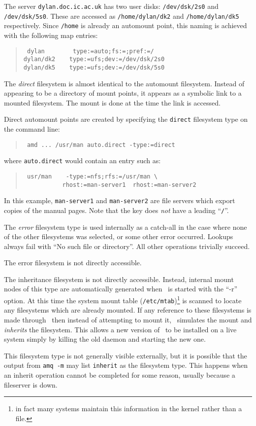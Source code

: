 The server {\tt dylan.doc.ic.ac.uk} has two user disks: {\tt /dev/dsk/2s0} and
{\tt /dev/dsk/5s0}.  These are accessed as {\tt /home/dylan/dk2} and
{\tt /home/dylan/dk5} respectively.  Since {\tt /home} is already an automount
point, this naming is achieved with the following map entries:
\begin{quote}\raggedright
\tt
dylan\ \ \ \ \ \ \ \ type:=auto;fs:=;pref:=/ \\
dylan/dk2\ \ \ \ type:=ufs;dev:=/dev/dsk/2s0 \\
dylan/dk5\ \ \ \ type:=ufs;dev:=/dev/dsk/5s0
\end{quote}

\label{direct-fs}

The {\em direct} filesystem is almost identical to the automount filesystem.
Instead of appearing to be a directory of mount points, it appears
as a symbolic link to a mounted filesystem.  The mount is done at
the time the link is accessed.

Direct automount points are created by specifying the {\tt direct} filesystem
type on the command line:
\begin{quote}
\tt
amd ... /usr/man auto.direct -type:=direct
\end{quote}
where {\tt auto.direct} would contain an entry such as:
\begin{quote}\raggedright
\tt
usr/man\ \ \ \ -type:=nfs;rfs:=/usr/man \verb+\+ \\
\ \ \ \ \ \ \ \ \ \ \ rhost:=man-server1\ \ rhost:=man-server2
\end{quote}
In this example, {\tt man-server1} and {\tt man-server2} are file servers
which export copies of the manual pages.
Note that the key does {\em not} have a leading ``{\tt /}''.

\label{error-fs}

The {\em error} filesystem type is used internally as a catch-all in
the case where none of the other filesystems was selected, or some other
error occurred.
Lookups always fail with ``No such file or directory''.
All other operations trivially succeed.

The error filesystem is not directly accessible.

\label{ifs}

The inheritance filesystem is not directly accessible.
Instead, internal mount nodes of this type are automatically generated
when \amd\ is started with the ``-r'' option.
At this time the system mount table ({\tt /etc/mtab})\footnote{
in fact many systems maintain this information in the kernel
rather than a file.}
is scanned to locate
any filesystems which are already mounted.  If any reference to 
these filesystems is made through \amd\ then instead of attempting
to mount it, \amd\ simulates the mount and {\em inherits} the
filesystem.  This allows a new version of \amd\ to be installed
on a live system simply by killing the old daemon and starting
the new one.

This filesystem type is not generally visible externally, but it is
possible that the output from {\tt amq -m} may list {\tt inherit} as
the filesystem type.  This happens when an inherit operation cannot
be completed for some reason, usually because a fileserver is down.
